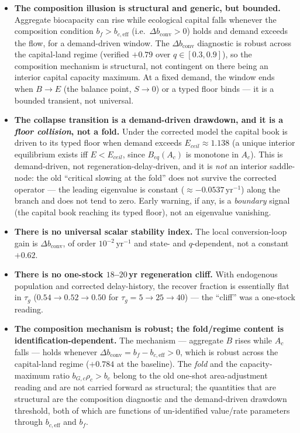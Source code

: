 \documentclass[11pt]{article}
\begin{document}
\begin{itemize}
\item \textbf{The composition illusion is structural and generic, but bounded.} Aggregate biocapacity can rise while ecological capital falls whenever the composition condition $b_f>b_{c,\mathrm{eff}}$ (i.e.\ $\Delta b_{\mathrm{conv}}>0$) holds and demand exceeds the flow, for a demand-driven window. The $\Delta b_{\mathrm{conv}}$ diagnostic is robust across the capital-land regime (verified $+0.79$ over $q\in[0.3,0.9]$), so the composition mechanism is structural, not contingent on there being an interior capital capacity maximum. At a fixed demand, the window ends when $B\to E$ (the balance point, $S\to0$) or a typed floor binds --- it is a bounded transient, not universal.
\item \textbf{The collapse transition is a demand-driven drawdown, and it is a \emph{floor collision}, not a fold.} Under the corrected model the capital book is driven to its typed floor when demand exceeds $E_{ceil}\approx1.138$ (a unique interior equilibrium exists iff $E<E_{ceil}$, since $B_{eq}(A_c)$ is monotone in $A_c$). This is demand-driven, not regeneration-delay-driven, and it is \emph{not} an interior saddle-node: the old ``critical slowing at the fold'' does not survive the corrected operator --- the leading eigenvalue is constant ($\approx-0.0537\,\text{yr}^{-1}$) along the branch and does not tend to zero. Early warning, if any, is a \emph{boundary} signal (the capital book reaching its typed floor), not an eigenvalue vanishing.
\item \textbf{There is no universal scalar stability index.} The local conversion-loop gain is $\Delta b_{\mathrm{conv}}$, of order $10^{-2}\,\text{yr}^{-1}$ and state- and $q$-dependent, not a constant $+0.62$.
\item \textbf{There is no one-stock $18$--$20$\,yr regeneration cliff.} With endogenous population and corrected delay-history, the recover fraction is essentially flat in $\tau_g$ ($0.54\to0.52\to0.50$ for $\tau_g=5\to25\to40$) --- the ``cliff'' was a one-stock reading.
\item \textbf{The composition mechanism is robust; the fold/regime content is identification-dependent.} The mechanism --- aggregate $B$ rises while $A_c$ falls --- holds whenever $\Delta b_{\mathrm{conv}}=b_f-b_{c,\mathrm{eff}}>0$, which is robust across the capital-land regime ($+0.784$ at the baseline). The \emph{fold} and the capacity-maximum ratio $b_{G,c}\rho_c>b_c$ belong to the old one-shot area-adjustment reading and are not carried forward as structural; the quantities that are structural are the composition diagnostic and the demand-driven drawdown threshold, both of which are functions of un-identified value/rate parameters through $b_{c,\mathrm{eff}}$ and $b_f$.

\end{itemize}
\end{document}
